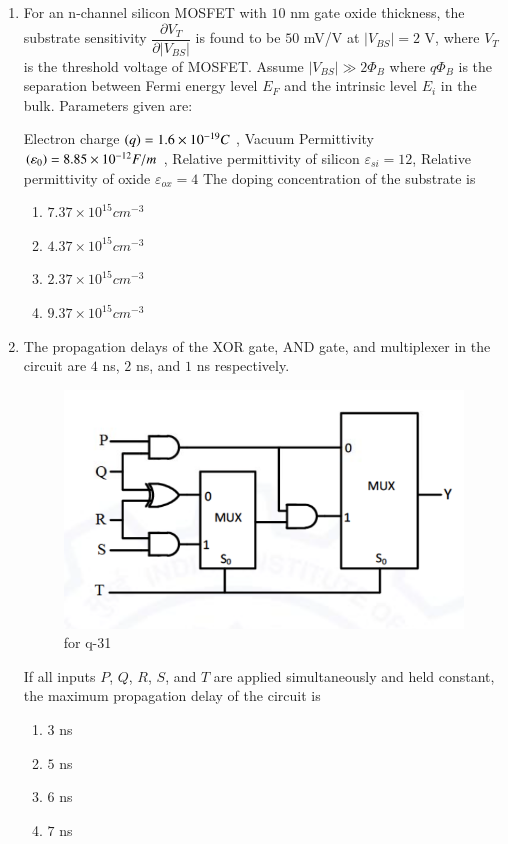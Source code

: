 \documentclass[journal,12pt,onecolumn]{IEEEtran}
\theoremstyle{remark}
\begin{document}
\begin{enumerate}
\item For an n-channel silicon MOSFET with $10$ nm gate oxide thickness, the substrate sensitivity $\dfrac{\partial V_T}{\partial |V_{BS}|}$ is found to be $50$ mV/V at $|V_{BS}| = 2$ V, where $V_T$ is the threshold voltage of MOSFET. Assume $|V_{BS}| \gg 2\Phi_B$ where $q\Phi_B$ is the separation between Fermi energy level $E_F$ and the intrinsic level $E_i$ in the bulk.  Parameters given are:

Electron charge $\left(q\right) = 1.6 \times 10^{-19} C$ , Vacuum Permittivity $\left(\varepsilon_0\right) = 8.85 \times 10^{-12} F/m$ , Relative permittivity of silicon $\varepsilon_{si} = 12$, Relative permittivity of oxide $\varepsilon_{ox} = 4$  
The doping concentration of the substrate is
\begin{multicols}{4}
\begin{enumerate}
\item $7.37 \times 10^{15} cm^{-3}$
\item $4.37 \times 10^{15} cm^{-3}$
\item $2.37 \times 10^{15} cm^{-3}$
\item $9.37 \times 10^{15} cm^{-3}$
\end{enumerate}
\end{multicols}
\hfill {}

\item The propagation delays of the XOR gate, AND gate, and multiplexer  in the circuit are $4$ ns, $2$ ns, and $1$ ns respectively.
\begin{figure}[H]
    \centering
    \includegraphics[width=0.4\columnwidth]{figs/16.png}
    \caption{\centering for q-31}
    \label{fig:placeholder_16}
\end{figure}
If all inputs $P$, $Q$, $R$, $S$, and $T$ are applied simultaneously and held constant, the maximum propagation delay of the circuit is
\begin{multicols}{4}
\begin{enumerate}
\item $3$ ns
\item $5$ ns
\item $6$ ns
\item $7$ ns
\end{enumerate}
\end{multicols}
\hfill {}


\end{enumerate}
\end{document}
